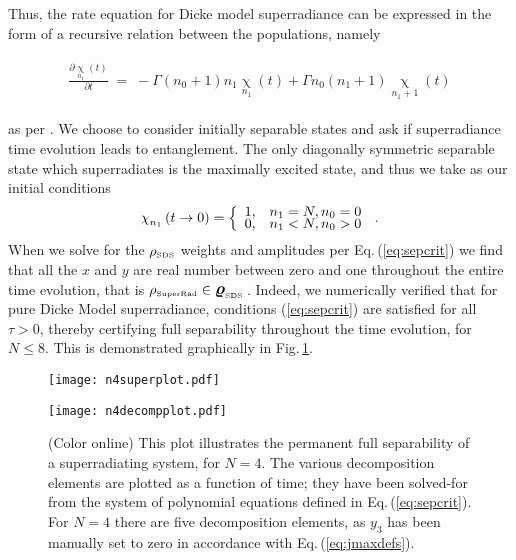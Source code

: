 \documentclass[
  12pt          %
  ,letterpaper  %
  ,center       %
  ,noupper      %
  ,english,fleqn]{uconnthesis}
\newcommand{\LeftEqns}[1]{\begin{fleqn}[\leftmargini minus \leftmargini]\begin{align}#1\end{align}\end{fleqn}}
\newcommand{\LeftEqn}[1]{\LeftEqns{\begin{split}#1\end{split}}}
\newcommand{\ceq}[1]{Eq.\,(\ref{#1})}
\newcommand{\fig}[1]{Fig.\,\ref{#1}}
\newcommand{\ochi}[2]{{\operatorname{\chi}\limits_{#2}^{}}}
\newcommand{\brho}[0]{\bm{\mbox{\large \(\varrho\)}}}
\begin{document}
Thus, the rate equation for Dicke model superradiance \citet{superrad.original} can be expressed in the form of a recursive relation between the populations, namely
\LeftEqn{\label{eq:superrad}
    \frac{\partial \ochi{n_0}{n_1}\left(t\right)}{\partial t}\;=\;-\Gamma\left(n_0+1\right)n_1 \ochi{n_0}{n_1}\left(t\right)+\Gamma n_0\left(n_1+1\right)\ochi{n_0-1}{n_1+1}\left(t\right)
}
as per \citet{superrad.original}. We choose to consider initially separable states and ask if superradiance time evolution leads to entanglement. The only diagonally symmetric separable state which superradiates is the maximally excited state, and thus we take as our initial conditions 
\begin{align}\label{eq:initconds}
	\ochi{n_0}{n_1} \left(t\rightarrow 0\right)=
	\renewcommand*{\arraystretch}{0.5}\left\lbrace\begin{array}{rl} 1,& {n_1=N,n_0=0}\\ 0,& {n_1<N,n_0>0}\end{array}\right.\,.
\end{align}
When we solve for the $\rho_{\text{\tiny SDS}}$ weights and amplitudes per \ceq{eq:sepcrit} we find that all the $x$ and $y$ are real number between zero and one throughout the entire time evolution, that is $\rho_{\text{\tiny SuperRad}}\in \brho_{\text{\tiny SDS}}\,$. Indeed, we numerically verified that for pure Dicke Model superradiance, conditions (\ref{eq:sepcrit}) are satisfied for all $\tau>0$, thereby certifying full separability throughout the time evolution, for $N\leq 8$. This is demonstrated graphically in \fig{fig:n4decompplot}.

\begin{figure}[p]
\centering
    \texttt{[image: n4superplot.pdf]}
    \caption{(Color online) Superradiance populations as a function of time, per \ceq{eq:superrad}. The system starts out entirely in the maximally excited state and evolves towards existing entirely in the ground state. At intermediate times the system is a mixture of populations.}\label{fig:n4superplot}
\vspace{31pt}
    \texttt{[image: n4decompplot.pdf]}
    \caption{(Color online) This plot illustrates the permanent full separability of a superradiating system, for $N=4$. The various decomposition elements are plotted as a function of time; they have been solved-for from the system of polynomial equations defined in \ceq{eq:sepcrit}. For $N=4$ there are five decomposition elements, as $y_3$ has been manually set to zero in accordance with \ceq{eq:jmaxdefs}.}\label{fig:n4decompplot}
\end{figure}
\FloatBarrier
\end{document}
